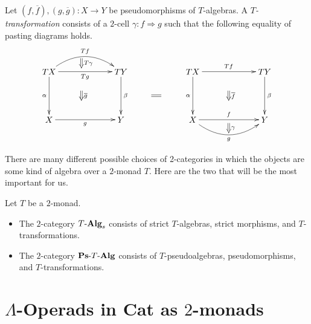 \begin{Defi}\label{Defi:Ttrans}
Let $(f, \overline{f}), (g, \overline{g}) \colon X \rightarrow Y$ be pseudomorphisms of $T$-algebras. A \textit{$T$-transformation} consists of a $2$-cell $\gamma \colon f \Rightarrow g$ such that the following equality of pasting diagrams holds.
    \[
        \xy
            (0,0)*+{TX}="00";
            (30,0)*+{TY}="10";
            (0,-20)*+{X}="01";
            (30,-20)*+{Y}="11";
            {\ar@/^1.5pc/^{Tf} "00" ; "10"};
            {\ar_{Tg} "00" ; "10"};
            {\ar^{\beta} "10" ; "11"};
            {\ar_{\alpha} "00" ; "01"};
            {\ar_{g} "01" ; "11"};
            {\ar@{=>}^{T \gamma} (13.5,5.5) ; (13.5,1.5)};
            {\ar@{=>}^{\overline{g}} (13.5,-8) ; (13.5,-12)};
            (60,0)*+{TX}="x00";
            (90,0)*+{TY}="x10";
            (60,-20)*+{X}="x01";
            (90,-20)*+{Y}="x11";
            {\ar^{Tf} "x00" ; "x10"};
            {\ar^{\beta} "x10" ; "x11"};
            {\ar_{\alpha} "x00" ; "x01"};
            {\ar^{f} "x01" ; "x11"};
            {\ar@/_1.5pc/_{g} "x01" ; "x11"};
            {\ar@{=>}^{\gamma} (75,-21.5) ; (75,-25.5)};
            {\ar@{=>}^{\overline{f}} (75,-8) ; (75,-12)};
            {\ar@{=} (42.75,-10) ; (46.75,-10)};
        \endxy
    \]
\end{Defi}

There are many different possible choices of 2-categories in which the objects are some kind of algebra over a $2$-monad $T$.
Here are the two that will be the most important for us.

\begin{Defi}\label{Defi:2cat-of-algs}
Let $T$ be a $2$-monad.
\begin{itemize}
\item The $2$-category $T\mbox{-}\mathbf{Alg}_{s}$ consists of strict $T$-algebras, strict morphisms, and $T$-transformations.
\item The $2$-category $\mathbf{Ps}\mbox{-}T\mbox{-}\mathbf{Alg}$ consists of $T$-pseudoalgebras, pseudomorphisms, and $T$-transformations.
\end{itemize}
\end{Defi}

\section{\texorpdfstring{$\Lambda$}{L}-Operads in Cat as $2$-monads}\label{sec:op-to-2monad}

